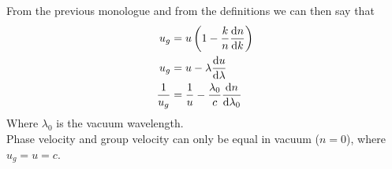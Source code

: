 \documentclass[../electromagnetism.tex]{subfiles}
\begin{document}
From the previous monologue and from the definitions we can then say that
\begin{equation}
	\begin{aligned}
		u_g&=u\left( 1-\frac{k}{n}\dv{n}{k} \right)\\
		u_g&=u-\lambda\dv{u}{\lambda}\\
		\frac{1}{u_g}&=\frac{1}{u}-\frac{\lambda_0}{c}\dv{n}{\lambda_0}
	\end{aligned}
	\label{eq:groupvelder}
\end{equation}
Where $\lambda_0$ is the vacuum wavelength.\\
Phase velocity and group velocity can only be equal in vacuum ($n=0$), where $u_g=u=c$.
\begin{comment}
\section{Doppler Effect}
Consider a source of waves and an observer moving in relative motion from one another. The frequency observed is changed compared to the measured frequency when there is no relative motion.\\
Say that the source is moving away from the receiver with velocity $u$. It's observed that the measured frequency is expanded from $\nu$ to $c+\nu$ with $c$ being the speed of the waves.\\
The observed frequency is
\begin{equation}
	\nu'=\nu\left( \frac{c}{c+u} \right)\approx\nu\left( 1-\frac{u}{c}+\frac{u^2}{c^2} \right)
	\label{eq:awayfreqdoppler}
\end{equation}
While, if the receiver (or the source) is moving away from the receiver, we will have
\begin{equation}
	\nu'=\nu\left( \frac{c-u}{c} \right)=\nu\left( 1-\frac{u}{c} \right)
	\label{eq:closerdoppler}
\end{equation}
or
\begin{equation*}
	\frac{\Delta\nu}{\nu}=\frac{u}{c}
\end{equation*}
These formulas, with these considerations, although equal to the first order, make no sense in the context of special relativity. The measured frequency is instead
\begin{equation}
	\nu'=n\sqrt{\frac{1-u/c}{1+u/c}}\approx\nu\left( 1-\frac{u}{c}+\frac{1}{2}\frac{u^2}{c^2} \right)
	\label{eq:reldoppler}
\end{equation}
Notice how the first order of the relativistic formula is exactly the same of the classical case
\end{comment}
\end{document}
